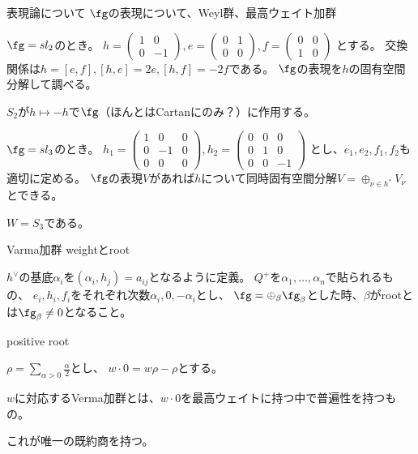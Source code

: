 \documentclass[dvipdfmx]{beamer}
\begin{document}
\begin{frame}{表現論について}
$\fg$の表現について、Weyl群、最高ウェイト加群

$\fg=sl_2$のとき。
$h=\begin{pmatrix}1&0\\0&-1\end{pmatrix},
e=\begin{pmatrix}0&1\\0&0\end{pmatrix},
f=\begin{pmatrix}0&0\\1&0\end{pmatrix}$
とする。
交換関係は$h=[e,f], [h,e]=2e, [h,f]=-2f$である。
$\fg$の表現を$h$の固有空間分解して調べる。

$S_2$が$h \mapsto -h$で$\fg$（ほんとはCartanにのみ？）に作用する。

$\fg=sl_3$のとき。
$h_1=\begin{pmatrix}1&0&0\\0&-1&0\\0&0&0\end{pmatrix},
h_2=\begin{pmatrix}0&0&0\\0&1&0\\0&0&-1\end{pmatrix}$
とし、$e_1, e_2, f_1,f_2$も適切に定める。
$\fg$の表現$V$があれば$h$について同時固有空間分解$V=\oplus_{\nu\in h^*}V_\nu$とできる。

$W=S_3$である。
\end{frame}

\begin{frame}{Varma加群}
weightとroot

$h^\vee$の基底$\alpha_i$を$(\alpha_i,h_j)=a_{ij}$となるように定義。
$Q^+$を$\alpha_1,\ldots,\alpha_n$で貼られるもの、
$e_i,h_i,f_i$をそれぞれ次数$\alpha_i,0,-\alpha_i$とし、
$\fg=\oplus_\beta\fg_\beta$とした時、$\beta$がrootとは$\fg_\beta\neq0$となること。

positive root

$\rho=\sum_{\alpha>0}\frac{\alpha}{2}$とし、
$w\cdot0=w\rho-\rho$とする。

$w$に対応するVerma加群とは、$w\cdot0$を最高ウェイトに持つ中で普遍性を持つもの。

これが唯一の既約商を持つ。
\end{frame}
\end{document}
